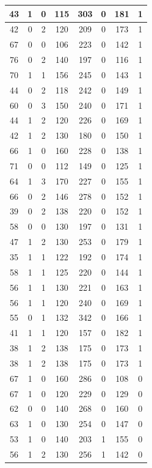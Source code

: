 \documentclass{article}
\begin{document}
\begin{longtable}{|c|c|c|c|c|c|c|c|}
\hline
43 & 1 & 0 & 115 & 303 & 0 & 181 & 1 \\
\hline
42 & 0 & 2 & 120 & 209 & 0 & 173 & 1 \\
\hline
67 & 0 & 0 & 106 & 223 & 0 & 142 & 1 \\
\hline
76 & 0 & 2 & 140 & 197 & 0 & 116 & 1 \\
\hline
70 & 1 & 1 & 156 & 245 & 0 & 143 & 1 \\
\hline
44 & 0 & 2 & 118 & 242 & 0 & 149 & 1 \\
\hline
60 & 0 & 3 & 150 & 240 & 0 & 171 & 1 \\
\hline
44 & 1 & 2 & 120 & 226 & 0 & 169 & 1 \\
\hline
42 & 1 & 2 & 130 & 180 & 0 & 150 & 1 \\
\hline
66 & 1 & 0 & 160 & 228 & 0 & 138 & 1 \\
\hline
71 & 0 & 0 & 112 & 149 & 0 & 125 & 1 \\
\hline
64 & 1 & 3 & 170 & 227 & 0 & 155 & 1 \\
\hline
66 & 0 & 2 & 146 & 278 & 0 & 152 & 1 \\
\hline
39 & 0 & 2 & 138 & 220 & 0 & 152 & 1 \\
\hline
58 & 0 & 0 & 130 & 197 & 0 & 131 & 1 \\
\hline
47 & 1 & 2 & 130 & 253 & 0 & 179 & 1 \\
\hline
35 & 1 & 1 & 122 & 192 & 0 & 174 & 1 \\
\hline
58 & 1 & 1 & 125 & 220 & 0 & 144 & 1 \\
\hline
56 & 1 & 1 & 130 & 221 & 0 & 163 & 1 \\
\hline
56 & 1 & 1 & 120 & 240 & 0 & 169 & 1 \\
\hline
55 & 0 & 1 & 132 & 342 & 0 & 166 & 1 \\
\hline
41 & 1 & 1 & 120 & 157 & 0 & 182 & 1 \\
\hline
38 & 1 & 2 & 138 & 175 & 0 & 173 & 1 \\
\hline
38 & 1 & 2 & 138 & 175 & 0 & 173 & 1 \\
\hline
67 & 1 & 0 & 160 & 286 & 0 & 108 & 0 \\
\hline
67 & 1 & 0 & 120 & 229 & 0 & 129 & 0 \\
\hline
62 & 0 & 0 & 140 & 268 & 0 & 160 & 0 \\
\hline
63 & 1 & 0 & 130 & 254 & 0 & 147 & 0 \\
\hline
53 & 1 & 0 & 140 & 203 & 1 & 155 & 0 \\
\hline
56 & 1 & 2 & 130 & 256 & 1 & 142 & 0 \\

\end{longtable}
\end{document}
